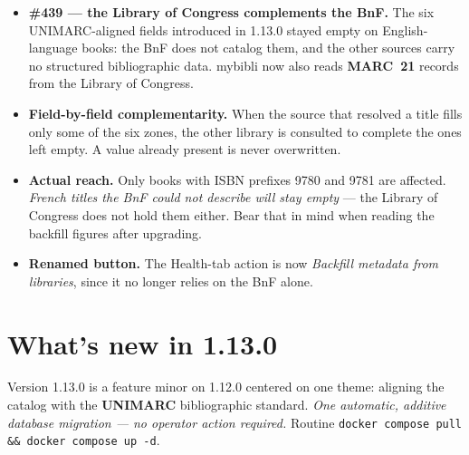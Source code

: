 \begin{itemize}
  \item \textbf{\#439 \string— the Library of Congress complements the
        BnF.} The six UNIMARC-aligned fields introduced in 1.13.0
        stayed empty on English-language books: the BnF does not
        catalog them, and the other sources carry no structured
        bibliographic data. mybibli now also reads \textbf{MARC~21}
        records from the Library of Congress.
  \item \textbf{Field-by-field complementarity.} When the source that
        resolved a title fills only some of the six zones, the other
        library is consulted to complete the ones left empty. A value
        already present is never overwritten.
  \item \textbf{Actual reach.} Only books with ISBN prefixes 9780 and
        9781 are affected. \emph{French titles the BnF could not
        describe will stay empty} — the Library of Congress does not
        hold them either. Bear that in mind when reading the backfill
        figures after upgrading.
  \item \textbf{Renamed button.} The Health-tab action is now
        \emph{Backfill metadata from libraries}, since it no longer
        relies on the BnF alone.
\end{itemize}

\section{What's new in 1.13.0}\label{sec:whats-new-1.13.0}

Version 1.13.0 is a feature minor on 1.12.0 centered on one theme:
aligning the catalog with the \textbf{UNIMARC} bibliographic
standard. \emph{One automatic, additive database migration — no
operator action required.} Routine \texttt{docker compose pull \&\&
docker compose up -d}.

